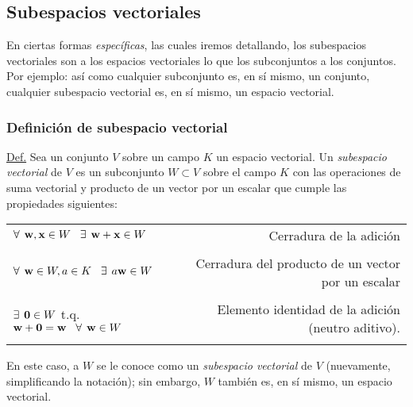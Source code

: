 \documentclass[12pt,dvipsnames]{article}
\begin{document}
\newpage
\subsection{Subespacios vectoriales} \label{Subsec:Subespacios_vectoriales}

En ciertas formas \emph{específicas}, las cuales iremos detallando, los subespacios vectoriales son a los espacios vectoriales lo que los subconjuntos a los conjuntos. Por ejemplo: así como cualquier subconjunto es, en sí mismo, un conjunto, cualquier subespacio vectorial es, en sí mismo, un espacio vectorial.

\subsubsection{Definición de subespacio vectorial} \label{Def:Subespacio_vectorial}

\begin{tcolorbox}
\underline{Def.} Sea un conjunto $V$ sobre un campo $K$ un espacio vectorial. Un \textit{subespacio vectorial} de $V$ es un subconjunto $W\subset V$ sobre el campo $K$ con las operaciones de suma vectorial y producto de un vector por un escalar que cumple las propiedades siguientes:

\begin{center}
\begin{tabular}{lr}
    $\forall\hspace{1.5mm} \mathbf{w},\mathbf{x}\in W \hspace{3mm}\exists \hspace{1.5mm} \mathbf{w}+\mathbf{x}\in W$ & Cerradura de la adición \\ \\ \multirow{2}{0.4\textwidth}{$\forall\hspace{1.5mm} \mathbf{w}\in W, a\in K \hspace{3mm}\exists \hspace{1.5mm} a\mathbf{w}\in W$} & \multirow{2}{0.28\textwidth}{Cerradura del producto de un vector por un escalar} \\ \\ \\
    $\exists \hspace{1.5mm} \mathbf{0}\in W$ t.q. $\mathbf{w}+\mathbf{0}=\mathbf{w}\hspace{3mm}\forall\hspace{1.5mm} \mathbf{w} \in W$ & Elemento identidad de la adición (neutro aditivo). \\ \\
\end{tabular}
\end{center}

\hspace{2.5mm} En este caso, a $W$ se le conoce como un \textit{subespacio vectorial} de $V$ (nuevamente, simplificando la notación); sin embargo, $W$ también es, en sí mismo, un espacio vectorial.

\end{tcolorbox}{}
\end{document}
